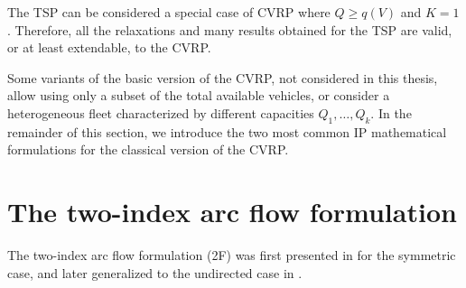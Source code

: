 \medskip

The TSP can be considered a special case of CVRP where $Q \ge q(V)$ and $K = 1$.
Therefore, all the relaxations and many results obtained for the TSP are valid, or at least extendable, to the CVRP.

\medskip

Some variants of the basic version of the CVRP,
not considered in this thesis,
allow using only a subset of the total available vehicles,
or consider a heterogeneous fleet characterized by different capacities $Q_1, \dots, Q_k$.
In the remainder of this section,
we introduce the two most common IP mathematical formulations for the classical version of the CVRP.

\section{The two-index arc flow formulation}
\label{sec:cvrp-two-index-flow-formulation}

The two-index arc flow formulation (2F)
was  first presented in \textcite{laporte1983, laporte1985} for the symmetric case,
and later generalized to the undirected case in \textcite{laporte1986}.

